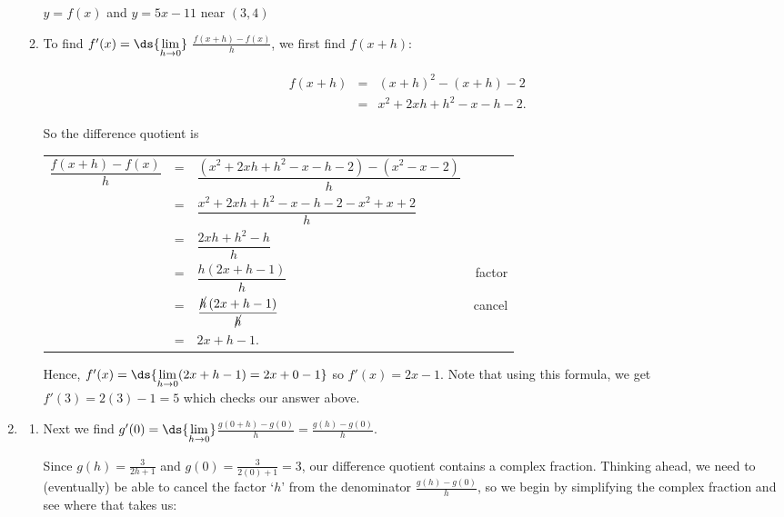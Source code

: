 \documentclass{ximera}
\begin{document}
\begin{example}
\begin{enumerate}
\begin{enumerate}
\begin{center}
 $y = f(x)$ and  $y = 5x-11$  near $(3,4)$  

 \end{center}

 \item To find $f'(x) = \ds{\lim_{h \rightarrow 0}}$ $\frac{f(x+h)-f(x)}{h}$, we first find $f(x+h)$:


\[ \begin{array}{rclr}  
 
 f(x+h) & = & (x+h)^2 - (x+h) -2 & \\ [8pt]
 & = & x^2 + 2xh + h^2 - x - h - 2.
 \end{array} \]

So the difference quotient is

\setlength{\extrarowheight}{12pt}

\begin{longtable}{rclr}  

$\dfrac{f(x+h)-f(x)}{h}$ & = & $\dfrac{\left(x^2+2xh+h^2-x-h-2 \right)-\left(x^{2}-x-2 \right)}{h}$ & \\[8pt] 
& = & $\dfrac{x^2+2xh+h^2-x-h-2-x^2+x+2}{h}$ & \\[8pt]
& = & $\dfrac{2xh+h^2-h}{h}$ & \\[8pt]
& = & $\dfrac{h \left(2x+h-1\right)}{h}$ & factor \\[8pt]
& = & $\dfrac{\cancel{h} \left(2x+h-1\right)}{\cancel{h}}$ & cancel \\[8pt]
& = & $2x+h-1$. \\

\end{longtable} 

Hence, $f'(x) = \ds{\lim_{h \rightarrow 0} (2x+h-1) = 2x + 0 - 1}$ so $f'(x) = 2x-1$. Note that using this formula, we get  $f'(3) = 2(3)-1 = 5$ which checks our answer above.


\end{enumerate}

\item  \begin{enumerate} \item Next we find  $g'(0) = \ds{\lim_{h \rightarrow 0}}$$\frac{g(0+h)-g(0)}{h}  = \frac{g(h) - g(0)}{h}$.

Since $g(h) = \frac{3}{2 h + 1}$ and $g(0) = \frac{3}{2(0)+1} = 3$, our difference quotient contains a complex fraction.  Thinking ahead, we need to (eventually) be able to cancel the factor `$h$' from the denominator $\frac{g(h) - g(0)}{h}$, so we begin by simplifying the complex fraction and see where that takes us:


\end{enumerate}
\end{enumerate}
\end{example}
\end{document}
